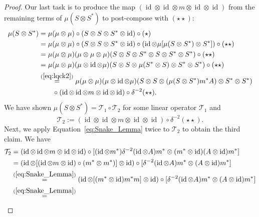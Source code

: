\documentclass[11pt]{article}
\theoremstyle{plain}
\theoremstyle{nonumberplain}
\theoremstyle{plain}
\theoremstyle{nonumberplain}
\newtheorem{proof}{Proof.}
\DeclareMathOperator{\id}{id}
\newcommand\1{{\bf 1}}
\newcommand{\<}{\left\langle}
\renewcommand{\>}{\right\rangle}
\begin{document}
\begin{proof}
Our last task is to produce the map $(\id\otimes\id\otimes m\otimes \id\otimes \id)$ from the remaining terms of $\mu(S\otimes S^*)$ to post-compose with $(\star\star)$:
    \begin{align*}
        \mu(S\otimes S^*)
        &=
        \mu (\mu\otimes \mu) \circ (S\otimes  S\otimes S^*\otimes \id)  \circ (\star)\\
        &=\mu (\mu\otimes \mu) \circ (S\otimes  S\otimes S^*\otimes \id)\circ 
            (\id \otimes \mu  [\mu  (S\otimes S^*) \otimes S^*])
    \circ (\star\star)\\
    &= \mu(\mu\otimes \mu)(\mu\otimes \mu\otimes \mu) (S\otimes S\otimes S^*\otimes S\otimes S^*\otimes S^*)\circ 
    (\star\star)\\
     &= \mu(\mu\otimes \mu)(\mu\otimes \id \otimes \mu) (S\otimes S\otimes \mu(S^*\otimes S)\otimes S^*\otimes S^*)\circ 
    (\star\star)\\
    &\overset{(\ref{eq:lqck2})}{=} \mu(\mu\otimes \mu)(\mu\otimes \id \otimes \mu) (S\otimes S\otimes (\mu(S\otimes S^*)m^*A)\otimes S^*\otimes S^*)\\
       &\quad \quad  \circ (\id \otimes \id\otimes m\otimes \id\otimes \id)\circ 
    \delta^{-2}(\star\star).
    \end{align*}    
    We have shown $\mu(S\otimes S^*) = \mathcal{T}_1 \circ \mathcal{T}_2$  for some linear operator $\mathcal{T}_1$ and 
    \[
    \mathcal{T}_2
    :=
    (\id \otimes \id\otimes m\otimes \id\otimes \id)\circ 
    \delta^{-2}(\star\star).\]
    Next, we apply Equation~\ref{eq:Snake_Lemma} twice to $\mathcal{T}_2$ to obtain the third claim. We have 
    \begin{align*}
    \mathcal{T}_2
    &=
    (\id \otimes \id \otimes m \otimes \id \otimes \id)
    \circ
    [ (\id\otimes m^*)\delta^{-2}(\id\otimes A)m^* \otimes (m^*\otimes \id)(A\otimes \id)m^*]\\
    &=
   (\id \otimes [(\id \otimes m \otimes \id)\circ (m^*\otimes m^*)] \otimes \id) \circ 
    [\delta^{-2}(\id\otimes A)m^* \otimes (A\otimes \id)m^*]\\
    &\overset{(\ref{eq:Snake_Lemma})}{=}
    (\id \otimes [(m^*\otimes \id)m^*m]\otimes \id)\circ 
    [\delta^{-2}(\id\otimes A)m^* \otimes (A\otimes \id)m^*]\\
  &\overset{(\ref{eq:Snake_Lemma})}{=}

\end{align*}
\end{proof}
\end{document}
